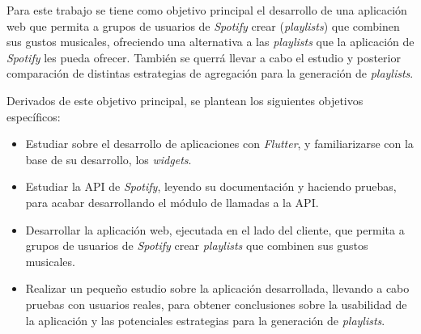 Para este trabajo se tiene como objetivo principal el desarrollo de una aplicación web que permita a grupos de usuarios de \textit{Spotify}
crear (\textit{playlists}) que combinen sus gustos musicales, ofreciendo una alternativa a las \textit{playlists} que la aplicación de \textit{Spotify}
 les pueda ofrecer. También se querrá llevar a cabo el estudio y posterior comparación de distintas estrategias de agregación para la generación de \textit{playlists}.
 
 Derivados de este objetivo principal, se plantean los siguientes objetivos específicos:

\begin{itemize}
  \item Estudiar sobre el desarrollo de aplicaciones con \textit{Flutter}, y familiarizarse con la base de su desarrollo, los \textit{widgets}.
  \item Estudiar la API de \textit{Spotify}, leyendo su documentación y haciendo pruebas, para acabar desarrollando el módulo de llamadas a la API.
  \item Desarrollar la aplicación web, ejecutada en el lado del cliente, que permita a grupos de usuarios de \textit{Spotify} crear \textit{playlists} que combinen sus gustos musicales.
  \item Realizar un pequeño estudio sobre la aplicación desarrollada, llevando a cabo pruebas con usuarios reales, para obtener conclusiones sobre 
la usabilidad de la aplicación y las potenciales estrategias para la generación de \textit{playlists}.
\end{itemize}
